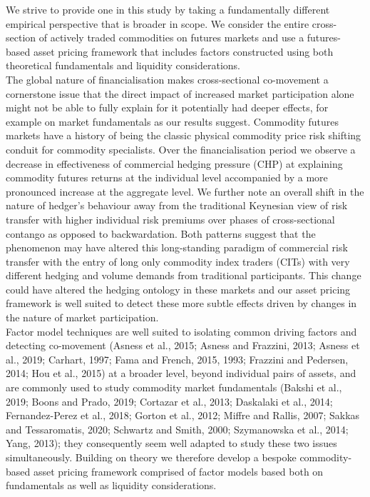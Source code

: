 \documentclass[]{elsarticle} %
\begin{document}
\medskip\setlength{\parindent}{0pt}

We strive to provide one in this study by taking a fundamentally different empirical perspective that is broader in scope. We consider the entire cross-section of actively traded commodities on futures markets and use a futures-based asset pricing framework that includes factors constructed using both theoretical fundamentals and liquidity considerations.\\
The global nature of financialisation makes cross-sectional co-movement a cornerstone issue that the direct impact of increased market participation alone might not be able to fully explain for it potentially had deeper effects, for example on market fundamentals as our results suggest. Commodity futures markets have a history of being the classic physical commodity price risk shifting conduit for commodity specialists. Over the financialisation period we observe a decrease in effectiveness of commercial hedging pressure (CHP) at explaining commodity futures returns at the individual level accompanied by a more pronounced increase at the aggregate level. We further note an overall shift in the nature of hedger's behaviour away from the traditional Keynesian view of risk transfer with higher individual risk premiums over phases of cross-sectional contango as opposed to backwardation. Both patterns suggest that the phenomenon may have altered this long-standing paradigm of commercial risk transfer with the entry of long only commodity index traders (CITs) with very different hedging and volume demands from traditional participants. This change could have altered the hedging ontology in these markets and our asset pricing framework is well suited to detect these more subtle effects driven by changes in the nature of market participation.\\
Factor model techniques are well suited to isolating common driving factors and detecting co-movement (Asness et al., 2015; Asness and Frazzini, 2013; Asness et al., 2019; Carhart, 1997; Fama and French, 2015, 1993; Frazzini and Pedersen, 2014; Hou et al., 2015) at a broader level, beyond individual pairs of assets, and are commonly used to study commodity market fundamentals (Bakshi et al., 2019; Boons and Prado, 2019; Cortazar et al., 2013; Daskalaki et al., 2014; Fernandez-Perez et al., 2018; Gorton et al., 2012; Miffre and Rallis, 2007; Sakkas and Tessaromatis, 2020; Schwartz and Smith, 2000; Szymanowska et al., 2014; Yang, 2013); they consequently seem well adapted to study these two issues simultaneously. Building on theory we therefore develop a bespoke commodity-based asset pricing framework comprised of factor models based both on fundamentals as well as liquidity considerations.\\
\end{document}
